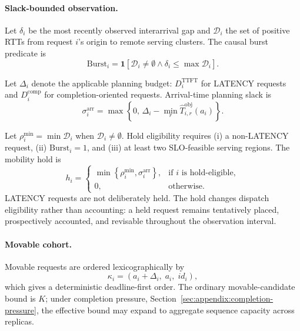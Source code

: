 \paragraph{Slack-bounded observation.}
Let $\delta_i$ be the most recently observed interarrival gap and
$\mathcal{D}_i$ the set of positive RTTs from request $i$'s origin to remote
serving clusters.
The causal burst predicate is
\begin{equation}
    \mathrm{Burst}_i
    =
    \mathbf{1}\!\left[
        \mathcal{D}_i\neq\emptyset
        \land
        \delta_i\le\max\mathcal{D}_i
    \right].
    \label{eq:appendix:burst-predicate}
\end{equation}

Let $\Delta_i$ denote the applicable planning budget:
$D_i^{\mathrm{TTFT}}$ for LATENCY requests and
$D_i^{\mathrm{comp}}$ for completion-oriented requests.
Arrival-time planning slack is
\begin{equation}
    \sigma_i^{\mathrm{arr}}
    =
    \max\!\left\{
        0,\,
        \Delta_i-\min_r
        \widehat{T}^{\mathrm{obj}}_{i,r}(a_i)
    \right\}.
    \label{eq:appendix:arrival-slack}
\end{equation}

Let $\rho_i^{\min}=\min\mathcal{D}_i$ when
$\mathcal{D}_i\neq\emptyset$.
Hold eligibility requires
(i) a non-LATENCY request,
(ii) $\mathrm{Burst}_i=1$, and
(iii) at least two SLO-feasible serving regions.
The mobility hold is
\begin{equation}
    h_i
    =
    \begin{cases}
        \min\!\left\{
            \rho_i^{\min},
            \sigma_i^{\mathrm{arr}}
        \right\},
        & \text{if $i$ is hold-eligible},\\
        0,
        & \text{otherwise}.
    \end{cases}
    \label{eq:appendix:mobility-hold}
\end{equation}
LATENCY requests are not deliberately held.
The hold changes dispatch eligibility rather than accounting: a held request
remains tentatively placed, prospectively accounted, and revisable throughout
the observation interval.

\paragraph{Movable cohort.}
Movable requests are ordered lexicographically by
\begin{equation}
    \kappa_i
    =
    \left(
        a_i+\Delta_i,\;
        a_i,\;
        id_i
    \right),
    \label{eq:appendix:planning-order}
\end{equation}
which gives a deterministic deadline-first order.
The ordinary movable-candidate bound is $K$; under completion pressure,
Section~\ref{sec:appendix:completion-pressure}, the effective bound may expand
to aggregate sequence capacity across replicas.

